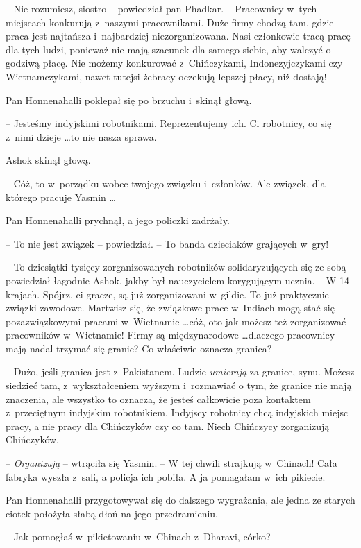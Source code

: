 \documentclass[oneside,polish,11pt,rmheadings]{mwbk}
\begin{document}
-- Nie rozumiesz, siostro -- powiedział pan Phadkar.  -- Pracownicy w~tych miejscach konkurują z~naszymi pracownikami. Duże firmy chodzą tam, gdzie praca jest najtańsza i~najbardziej niezorganizowana. Nasi członkowie tracą pracę dla tych ludzi, ponieważ nie mają szacunek dla samego siebie, aby walczyć o godziwą płacę. Nie możemy konkurować z~Chińczykami, Indonezyjczykami czy Wietnamczykami, nawet tutejsi żebracy oczekują lepszej płacy, niż dostają! 

Pan Honnenahalli poklepał się po brzuchu i~skinął głową. 

-- Jesteśmy indyjskimi robotnikami. Reprezentujemy ich. Ci robotnicy, co się z~nimi dzieje  \ldots  to nie nasza sprawa.

Ashok skinął głową.

 -- Cóż, to w~porządku wobec twojego związku i~członków. Ale związek, dla którego pracuje Yasmin \ldots 

Pan Honnenahalli prychnął, a jego policzki zadrżały. 

-- To nie jest związek -- powiedział. -- To banda dzieciaków grających w~gry!

-- To dziesiątki tysięcy zorganizowanych robotników solidaryzujących się ze sobą -- powiedział łagodnie Ashok, jakby był nauczycielem korygującym ucznia. -- W 14 krajach. Spójrz, ci gracze, są już zorganizowani w~gildie. To już praktycznie związki zawodowe. Martwisz się, że związkowe prace w~Indiach mogą stać się pozazwiązkowymi pracami w~Wietnamie  \ldots  cóż, oto jak możesz też zorganizować pracowników w~Wietnamie! Firmy są międzynarodowe  \ldots  dlaczego pracownicy mają nadal trzymać się granic? Co właściwie oznacza granica?

-- Dużo, jeśli granica jest z~Pakistanem. Ludzie \textit{umierają }za granice, synu. Możesz siedzieć tam, z~wykształceniem wyższym i~rozmawiać o tym, że granice nie mają znaczenia, ale wszystko to oznacza, że jesteś całkowicie poza kontaktem z~przeciętnym indyjskim robotnikiem. Indyjscy robotnicy chcą indyjskich miejsc pracy, a nie pracy dla Chińczyków czy co tam. Niech Chińczycy zorganizują Chińczyków.

-- \textit{Organizują} -- wtrąciła się Yasmin. -- W tej chwili strajkują w~Chinach! Cała fabryka wyszła z~sali, a policja ich pobiła. A ja pomagałam w~ich pikiecie.

Pan Honnenahalli przygotowywał się do dalszego wygrażania, ale jedna ze starych ciotek położyła słabą dłoń na jego przedramieniu.

-- Jak pomogłaś w~pikietowaniu w~Chinach z~Dharavi, córko?
\end{document}
